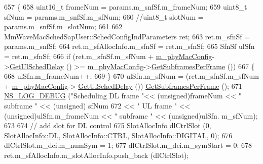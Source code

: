 \begin{DoxyCode}
657 \{
658         uint16\_t frameNum = params.m\_snfSf.m\_frameNum;
659         uint8\_t sfNum = params.m\_snfSf.m\_sfNum;
660         \textcolor{comment}{//uint8\_t slotNum = params.m\_snfSf.m\_slotNum;}
661 
662         MmWaveMacSchedSapUser::SchedConfigIndParameters ret;
663         ret.m\_sfnSf = params.m\_snfSf;
664         ret.m\_sfAllocInfo.m\_sfnSf = ret.m\_sfnSf;
665         SfnSf ulSfn = ret.m\_sfnSf;
666         \textcolor{keywordflow}{if} (ret.m\_sfnSf.m\_sfNum + \hyperlink{classns3_1_1MmWaveMacScheduler_a24d7af4971d2e500fe543cefbafa2fd9}{m\_phyMacConfig}->\hyperlink{classns3_1_1MmWavePhyMacCommon_afd70935ec71838fefe6a8e18198f19cb}{GetUlSchedDelay} () >=  
      \hyperlink{classns3_1_1MmWaveMacScheduler_a24d7af4971d2e500fe543cefbafa2fd9}{m\_phyMacConfig}->\hyperlink{classns3_1_1MmWavePhyMacCommon_a3709cf52f6813eb8ad1af16d95082dc1}{GetSubframesPerFrame} ())
667         \{
668                 ulSfn.m\_frameNum++;
669         \}
670         ulSfn.m\_sfNum = (ret.m\_sfnSf.m\_sfNum + \hyperlink{classns3_1_1MmWaveMacScheduler_a24d7af4971d2e500fe543cefbafa2fd9}{m\_phyMacConfig}->
      \hyperlink{classns3_1_1MmWavePhyMacCommon_afd70935ec71838fefe6a8e18198f19cb}{GetUlSchedDelay} ()) %
      \hyperlink{classns3_1_1MmWavePhyMacCommon_a3709cf52f6813eb8ad1af16d95082dc1}{GetSubframesPerFrame} ();
671         \hyperlink{group__logging_ga413f1886406d49f59a6a0a89b77b4d0a}{NS\_LOG\_DEBUG} (\textcolor{stringliteral}{"Scheduling DL frame "}<< (\textcolor{keywordtype}{unsigned})frameNum << \textcolor{stringliteral}{" subframe "} << (\textcolor{keywordtype}{unsigned})
      sfNum
672                       << \textcolor{stringliteral}{" UL frame "} << (\textcolor{keywordtype}{unsigned})ulSfn.m\_frameNum << \textcolor{stringliteral}{" subframe "} << (\textcolor{keywordtype}{unsigned})ulSfn.
      m\_sfNum);
673 
674         \textcolor{comment}{// add slot for DL control}
675         SlotAllocInfo dlCtrlSlot (0, \hyperlink{structns3_1_1SlotAllocInfo_a6cad60db1d39034f1851e2cea625fe5da9a365c9c56b7c32dcae38ee1a468ce6d}{SlotAllocInfo::DL}, 
      \hyperlink{structns3_1_1SlotAllocInfo_a3ea7cb503bfd0c9a4df55a71b81b9331ad78b7d76ef82d56c33be1fa9c1867409}{SlotAllocInfo::CTRL}, \hyperlink{structns3_1_1SlotAllocInfo_adcbd067d82be6260b3399167d8f0b4eca47a67c342db658a08ded9ce4b49417ea}{SlotAllocInfo::DIGITAL}, 0);
676         dlCtrlSlot.m\_dci.m\_numSym = 1;
677         dlCtrlSlot.m\_dci.m\_symStart = 0;
678         ret.m\_sfAllocInfo.m\_slotAllocInfo.push\_back (dlCtrlSlot);

\end{DoxyCode}

